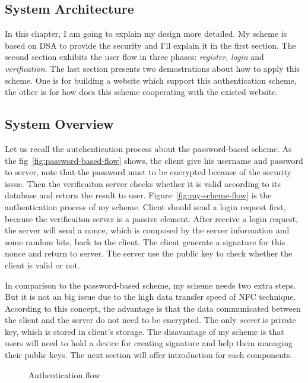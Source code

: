 \begin{CJK}{Bg5}{bsmi}


\chapter{System Architecture}

In this chapter, I am going to explain my design more detailed. My scheme is based on DSA to provide the security and I'll explain it in the first section. The second section exhibits the user flow in three phases: \emph{register}, \emph{login} and \emph{verification}. The last section presents two demostrations about how to apply this scheme. One is for building a website which support this authentication scheme, the other is for how does this scheme cooperating with the existed website.

\section{System Overview}

Let us recall the autehentication process about the password-based scheme. As the fig~\ref{fig:password-based-flow} shows, the client give his username and password to server, note that the password must to be encrypted because of the security issue. Then the verificaiton server checks whether it is valid according to its database and return the result to user. Figure~\ref{fig:my-scheme-flow} is the authentication process of my scheme. Client should send a login request first, because the verificaiton server is a passive element. After receive a login request, the server will send a nonce, which is composed by the server information and some random bits, back to the client. The client generate a signature for this nonce and return to server. The server use the public key to check whether the client is valid or not.

In comparison to the password-based scheme, my scheme needs two extra steps. But it is not an big issue due to the high data transfer speed of NFC technique. According to this concept, the advantage is that the data communicated between the client and the server do not need to be encrypted. The only \emph{secret} is private key, which is stored in client's storage. The disavantage of my scheme is that users will need to hold a device for creating signature and help them managing their public keys. The next section will offer introduction for each components.
\begin{figure}
\centering
{}
\caption{Authentication flow}
\end{figure}


\end{CJK}
